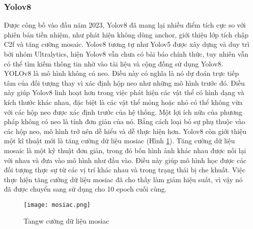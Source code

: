 \documentclass[../the.tex]{subfiles}
\begin{document}
\subsubsection{Yolov8} 
{\fontsize{13}{12} \selectfont 
Được công bố vào đầu năm 2023, Yolov8 đã mang lại nhiều điểm tích cực so với phiên bản tiền nhiệm, như phát hiện không dùng anchor, giới thiệu lớp tích chập C2f và tăng cường mosaic.
Yolov8 tương tự như Yolov5 được xây dựng và duy trì bởi nhóm Ultralytics, hiện Yolov8 vẫn chưa có bài báo chính thức, tuy nhiên vẫn có thể tìm kiếm thông tin nhờ vào tài liệu và cộng đồng sử dụng Yolov8.
YOLOv8 là mô hình không có neo. Điều này có nghĩa là nó dự đoán trực tiếp tâm của đối tượng thay vì xác định hộp neo như những mô hình trước đó.
Điều này giúp Yolov8 linh hoạt hơn trong việc phát hiện các vật thể có hình dạng và kích thước khác nhau, đặc biệt là các vật thể mỏng hoặc nhỏ có thể không vừa với các hộp neo được xác định trước của hệ thống. 
Một lợi ích nữa của phương pháp không có neo là tính đơn giản của nó. Bằng cách loại bỏ sự phụ thuộc vào các hộp neo, mô hình trở nên dễ hiểu và dễ thực hiện hơn.
Yolov8 còn giới thiệu một kĩ thuật mới là tăng cường dữ liệu mosiac (Hình \ref{fig:mosaic}). Tăng cường dữ liệu mosaic là một kỹ thuật đơn giản, trong đó bốn hình ảnh khác nhau được nối lại với nhau và đưa vào mô hình như đầu vào. Điều này giúp mô hình học được các đối tượng thực sự từ các vị trí khác nhau và trong trạng thái bị che khuất.
Việc thực hiện tăng cường dữ liệu mosiac đã cho thấy làm giảm hiệu suất, vì vậy nó đã được chuyển sang sử dụng cho 10 epoch cuối cùng.
}
\begin{figure}[H]
	\centering
	\texttt{[image: mosiac.png]}
	\caption[]{Tangw cường dữ liệu mosiac\footnotemark}
	\label{fig:mosaic}
\end{figure}
\bigskip
{}
\end{document}
